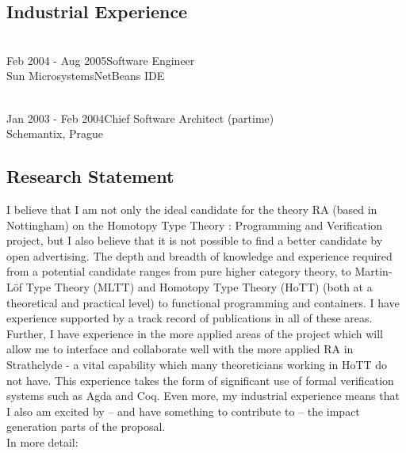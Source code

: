 \documentclass[a4paper]{article}
\newcommand{\project}{Homotopy Type Theory : Programming and Verification}
\newcommand{\mltt}{MLTT}
\begin{document}
\subsection*{Industrial Experience}
\vspace{-1em}
\begin{tabbing}
  \hspace{4cm}\=\\
  Feb 2004 - Aug 2005\>Software Engineer\\
  Sun Microsystems\>NetBeans IDE 
\end{tabbing}
\vspace{-2em}
\begin{tabbing}
\hspace{4cm}\=\\
Jan 2003 - Feb 2004\>Chief Software Architect (partime)\\
Schemantix, Prague
\end{tabbing}


\subsection*{Research Statement}
I believe that I am not only the ideal candidate for the theory RA
(based in Nottingham) on the {\project} project, but I also believe
that it is not possible to find a better candidate by open
advertising. The depth and breadth of knowledge and experience
required from a potential candidate ranges from pure higher category
theory, to Martin-L\"of Type Theory ({\mltt}) and Homotopy Type Theory
(HoTT) (both at a theoretical and practical level) to functional
programming and containers. I have experience supported by a track
record of publications in all of these areas. Further, I have
experience in the more applied areas of the project which will allow me
to interface and collaborate well with the more applied RA in
Strathclyde - a vital capability which many theoreticians working in
HoTT do not have. This experience takes the form of significant use of
formal verification systems such as Agda and Coq. Even more, my
industrial experience means that I also am excited by -- and have
something to contribute to -- the impact generation parts of the
proposal. \\[1ex]

\noindent In more detail:


\end{document}
